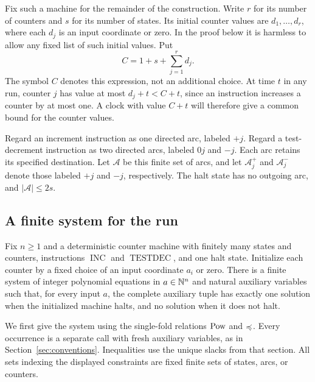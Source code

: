 Fix such a machine for the remainder of the construction. Write $r$ for
its number of counters and $s$ for its number of states. Its initial
counter values are $d_1,\ldots,d_r$, where each $d_j$ is an input
coordinate or zero. In the proof below it is harmless to allow any fixed
list of such initial values. Put
\begin{equation}\label{eq:machine-C}
 C=1+s+\sum_{j=1}^r d_j.
\end{equation}
The symbol $C$ denotes this expression, not an additional choice.
At time $t$ in any run, counter $j$ has value at most $d_j+t<C+t$,
since an instruction increases a counter by at most one. A clock with
value $C+t$ will therefore give a common bound for the counter values.

Regard an increment instruction as one directed arc, labeled $+j$.
Regard a test-decrement instruction as two directed arcs, labeled
$0j$ and $-j$. Each arc retains its specified destination. Let
$\mathcal A$ be this finite set of arcs, and let
$\mathcal A_j^+$ and $\mathcal A_j^-$ denote those labeled $+j$ and
$-j$, respectively. The halt state has no outgoing arc, and
$|\mathcal A|\leq 2s$.

\subsection{A finite system for the run}

\begin{proposition}\label{prop:machine-compiler}
Fix $n\ge1$ and a deterministic counter machine with finitely many states
and counters, instructions $\operatorname{INC}$ and $\operatorname{TESTDEC}$,
and one halt state. Initialize each counter by a fixed choice of an input
coordinate $a_i$ or zero. There is a finite system of integer polynomial
equations in $a\in\mathbb N^n$ and natural auxiliary variables such that, for
every input $a$, the complete auxiliary tuple has exactly one solution
when the initialized machine halts, and no solution when it does not halt.
\end{proposition}

We first give the system using the single-fold relations $\operatorname{Pow}$ and
$\preccurlyeq$. Every occurrence is a separate call with fresh auxiliary
variables, as in Section~\ref{sec:conventions}. Inequalities use the unique
slacks from that section. All sets indexing the displayed constraints
are fixed finite sets of states, arcs, or counters.

